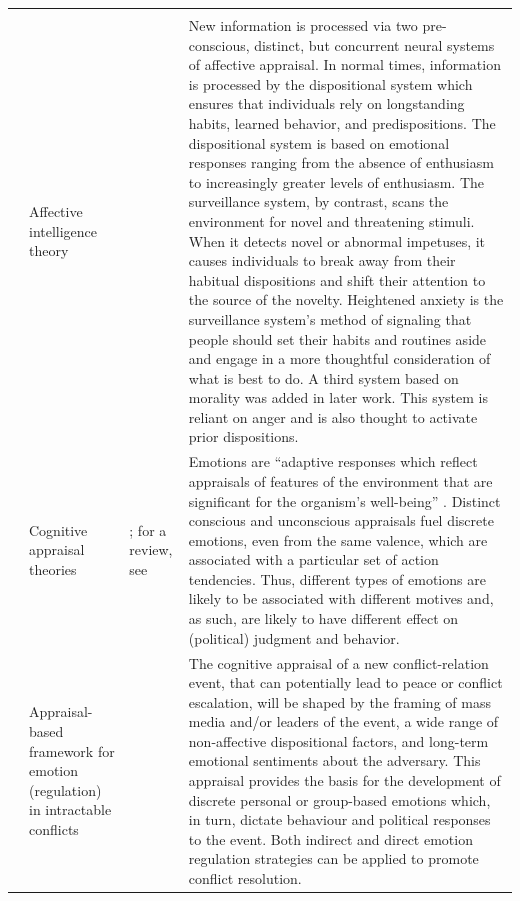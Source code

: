 \begin{landscape}
\begin{longtable}{@{}lL{4.5cm}L{3.3cm}p{11.5cm}@{}}
\newpage
{} &  \\
 & Affective intelligence theory & \cite{Marcus2000} & New information is processed via two pre-conscious, distinct, but concurrent neural systems of affective appraisal. In normal times, information is processed by the dispositional system which ensures that individuals rely on longstanding habits, learned behavior, and predispositions. The dispositional system is based on emotional responses ranging from the absence of enthusiasm to increasingly greater levels of enthusiasm. The surveillance system, by contrast, scans the environment for novel and threatening stimuli. When it detects novel or abnormal impetuses, it causes individuals to break away from their habitual dispositions and shift their attention to the source of the novelty. Heightened anxiety is the surveillance system’s method of signaling that people should set their habits and routines aside and engage in a more thoughtful consideration of what is best to do. A third system based on morality was added in later work. This system is reliant on anger and is also thought to activate prior dispositions. \\
 & Cognitive appraisal theories & \cite{Lazarus1966, Lazarus1991, Lerner2000, Lerner2001}; for a review, see \cite{Moors2013} & Emotions are “adaptive responses which reflect appraisals of features of the environment that are significant for the organism’s well-being” \citep[][p. 119]{Moors2013}. Distinct conscious and unconscious appraisals fuel discrete emotions, even from the same valence, which are associated with a particular set of action tendencies. Thus, different types of emotions are likely to be associated with different motives and, as such, are likely to have different effect on (political) judgment and behavior. \\
 & Appraisal-based framework for emotion (regulation) in intractable conflicts & \cite{Halperin2014} & The cognitive appraisal of a new conflict-relation event, that can potentially lead to peace or conflict escalation, will be shaped by the framing of mass media and/or leaders of the event, a wide range of non-affective dispositional factors, and long-term emotional sentiments about the adversary. This appraisal provides the basis for the development of discrete personal or group-based emotions which, in turn, dictate behaviour and political responses to the event. Both indirect and direct emotion regulation strategies can be applied to promote conflict resolution. \\

\end{longtable}
\end{landscape}
